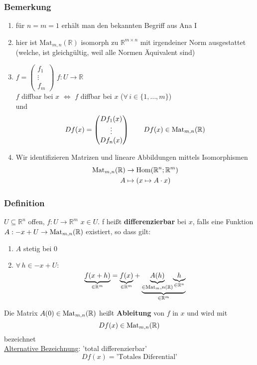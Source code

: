 \subsubsection{Bemerkung} %
\label{ssub:bemerkung}
\begin{enumerate}
	\item für $n=m=1$ erhält man den bekannten Begriff aus Ana I 
	\item hier ist $\text{Mat}_{m,n}(\mathbb{R})$ isomorph zu $\mathbb{R}^{m \times n}$ mit irgendeiner Norm ausgestattet (welche, ist gleichgültig, weil alle Normen
	Äquivalent sind)
	\item $f= \begin{pmatrix}
		f_1 \\ \vdots \\ f_m
	\end{pmatrix}$ $f: U \to \mathbb{R}$ \\
	$f$ diffbar bei $x$ $\Leftrightarrow$ $f$ diffbar bei $x$ ($\forall\, i \in \{1,\dots,m\}$) \\
	und
	\[
		Df(x)= \begin{pmatrix}
			Df_1(x) \\
			\vdots \\
			Df_n(x)
		\end{pmatrix} \qquad Df(x) \in \operatorname{Mat}_{m,n}(\mathbb{R})
	\]
	\item Wir identifizieren Matrizen und lineare Abbildungen mittels Isomorphismen
	\begin{align*}
		\operatorname{Mat}_{m,n}(\mathbb{R}) &\rightarrow \operatorname{Hom}(\mathbb{R}^n;\mathbb{R}^m) \\
		 A &\mapsto (x \mapsto A \cdot x)
	\end{align*}
\end{enumerate}
\subsubsection{Definition} %
\label{ssub:definition}
$U \subseteq \mathbb{R}^n$ offen, $f:U \to \mathbb{R}^m$ $x \in U$. f heißt {\bfseries differenzierbar} bei $x$, falls eine Funktion $A: -x+U \to \operatorname{Mat}_{m,n}(\mathbb{R})$ existiert, so dass gilt:
\begin{enumerate}
	\item $A$ stetig bei 0
	\item $\forall\, h \in -x+U:$
	\[
		\underset{\in \mathbb{R}^m}{\underbrace{f(x+h)}} = \underset{\in \mathbb{R}^m}{\underbrace{f(x)}} + \underset{\in \mathbb{R}^m}{\underbrace{\underset{
		\in \operatorname{Mat}_m,n(\mathbb{R})}{\underbrace{A(h)}}
		\underset{\in \mathbb{R}^n}{\underbrace{h}}}}
	\]
\end{enumerate}
Die Matrix $A(0) \in \operatorname{Mat}_{m,n}(\mathbb{R})$ heißt {\bfseries Ableitung} von $f$ in $x$ und wird mit
\[
	Df(x) \in \operatorname{Mat}_{m,n}(\mathbb{R})
\]
bezeichnet \\
\underline{Alternative Bezeichnung}:
'total differenzierbar' \\
\[
	Df(x)=\text{'Totales Diferential'}
\]
